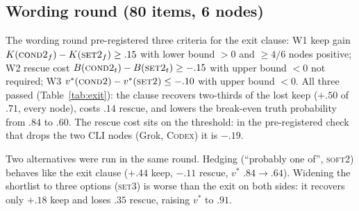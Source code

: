 \documentclass[11pt]{article}
\begin{document}
\subsection{Wording round (80 items, 6 nodes)}
The wording round pre-registered three criteria for the exit clause: W1 keep gain $K(\textsc{cond2}_f)-K(\textsc{set2}_f)\ge .15$ with lower bound $>0$ and $\ge 4/6$ nodes positive; W2 rescue cost $B(\textsc{cond2}_t)-B(\textsc{set2}_t)\ge -.15$ with upper bound $<0$ not required; W3 $v^\ast(\textsc{cond2})-v^\ast(\textsc{set2})\le -.10$ with upper bound $<0$. All three passed (Table~\ref{tab:exit}): the clause recovers two-thirds of the lost keep ($+.50$ of $.71$, every node), costs $.14$ rescue, and lowers the break-even truth probability from $.84$ to $.60$. The rescue cost sits on the threshold: in the pre-registered check that drops the two CLI nodes (Grok, \textsc{Codex}) it is $-.19$.

Two alternatives were run in the same round. Hedging (``probably one of'', \textsc{soft2}) behaves like the exit clause ($+.44$ keep, $-.11$ rescue, $v^\ast$ $.84\to.64$). Widening the shortlist to three options (\textsc{set3}) is worse than the exit on both sides: it recovers only $+.18$ keep and loses $.35$ rescue, raising $v^\ast$ to $.91$.
\end{document}
